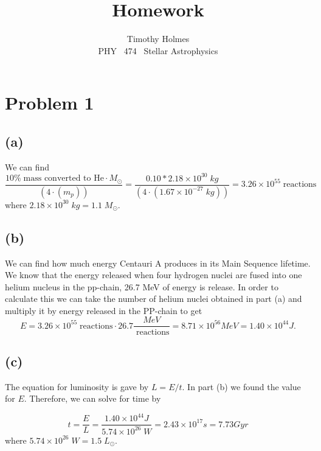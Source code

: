 \documentclass[11pt]{article}
\newcommand{\HWnum}{}
\newcommand{\CourseNum}{474}           %
\newcommand{\Subject}{PHY}
\begin{document}

\title{Homework {\HWnum}}
\author{Timothy Holmes \\ \Subject ~ \CourseNum ~ Stellar Astrophysics}

\maketitle

\section*{Problem 1}

\subsection*{(a)}

We can find 
$$
\frac{10 \% \; \text{mass converted to He} \cdot M_{\odot}}{(4 \cdot (m_{p}))} = \frac{0.10 * 2.18 \times 10^{30} \; kg}{(4 \cdot (1.67 \times 10^{-27} \; kg))} = 3.26 \times 10^{55} \; \text{reactions}
$$
where $2.18 \times 10^{30} \; kg = 1.1 \; M_{\odot}$.

\subsection*{(b)}

We can find how much energy Centauri A produces in its Main Sequence lifetime. We know that the energy released when four hydrogen nuclei are fused into one helium nucleus in the pp-chain, 26.7 MeV of energy is release. In order to calculate this we can take the number of helium nuclei obtained in part (a) and multiply it by energy released in the PP-chain to get
$$
E = 3.26 \times 10^{55}  \; \text{reactions} \cdot 26.7 \frac{MeV}{ \; \text{reactions}} = 8.71 \times 10^{56} MeV = 1.40 \times 10^{44} J.
$$

\subsection*{(c)}

The equation for luminosity is gave by $L = E/t$. In part (b) we found the value for $E$. Therefore, we can solve for time by 

$$
t = \frac{E}{L} = \frac{1.40 \times 10^{44} J}{5.74 \times 10^{26} \; W } = 2.43 \times 10^{17} s = 7.73 Gyr
$$
where $5.74 \times 10^{26} \; W = 1.5 \; L_{\odot}$.
\end{document}
